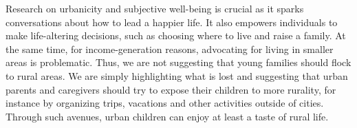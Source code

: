 \documentclass[11pt, letterpaper]{article}
\begin{document}
\begin{spacing}{1.9}
Research on urbanicity and subjective well-being is crucial as it sparks
conversations about how to lead a happier life. It also empowers individuals to
make life-altering decisions, such as choosing where to live and raise a
family. At the same time, for income-generation reasons, advocating for living
in smaller areas is  problematic. Thus, we are not suggesting that young
families should flock to rural areas. We are simply highlighting what is lost and suggesting that urban parents and caregivers should try to expose their children to more rurality, for instance by organizing
trips, vacations and other activities outside of cities. Through such avenues,
urban children can enjoy at least a taste of rural life. 


                                                       


    



\end{spacing}
\end{document}
